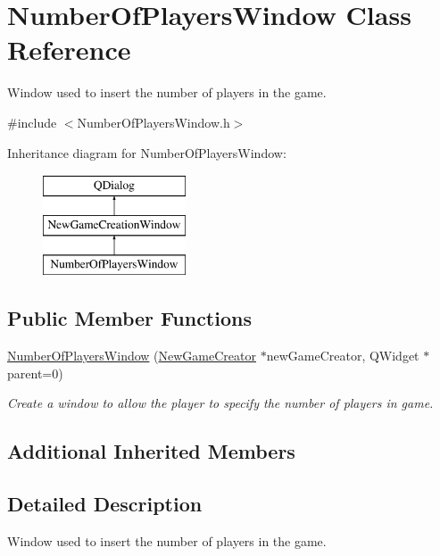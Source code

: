\hypertarget{classNumberOfPlayersWindow}{}\section{Number\+Of\+Players\+Window Class Reference}
\label{classNumberOfPlayersWindow}


Window used to insert the number of players in the game.  




{\ttfamily \#include $<$Number\+Of\+Players\+Window.\+h$>$}

Inheritance diagram for Number\+Of\+Players\+Window\+:\begin{figure}[H]
\begin{center}
\leavevmode
\includegraphics[height=3.000000cm]{classNumberOfPlayersWindow}
\end{center}
\end{figure}
\subsection*{Public Member Functions}
\begin{DoxyCompactItemize}
\item 
\hyperlink{classNumberOfPlayersWindow_a522ce7de553a78ef1514cc988abb8d38}{Number\+Of\+Players\+Window} (\hyperlink{classNewGameCreator}{New\+Game\+Creator} $\ast$new\+Game\+Creator, Q\+Widget $\ast$parent=0)
\begin{DoxyCompactList}\small\item\em Create a window to allow the player to specify the number of players in game. \end{DoxyCompactList}\end{DoxyCompactItemize}
\subsection*{Additional Inherited Members}


\subsection{Detailed Description}
Window used to insert the number of players in the game. 

